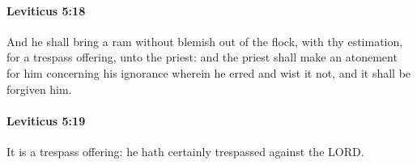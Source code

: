 		\paragraph{Leviticus 5:18} %
			\label{LEVITICUS-5-18}

			And he shall bring a ram without blemish out of the flock, with thy estimation, for a trespass offering, unto the priest: and the priest shall make an atonement for him concerning his ignorance wherein he erred and wist it not, and it shall be forgiven him.


		\paragraph{Leviticus 5:19} %
			\label{LEVITICUS-5-19}

			It is a trespass offering: he hath certainly trespassed against the LORD.

